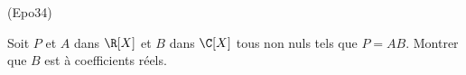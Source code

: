 \begin{tiny}(Epo34)\end{tiny} Soit $P$ et $A$ dans $\R[X]$ et $B$ dans $\C[X]$ tous non nuls tels que $P=AB$. Montrer que $B$ est à coefficients réels. 